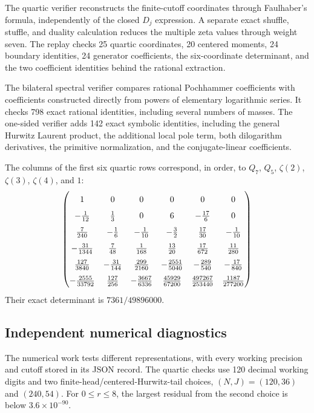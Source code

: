 The quartic verifier reconstructs the finite-cutoff coordinates through
Faulhaber's formula, independently of the closed $D_j$ expression.
A separate exact shuffle, stuffle, and duality calculation reduces
the multiple zeta values through weight seven.  The replay checks
25 quartic coordinates, 20 centered moments, 24 boundary identities,
24 generator coefficients, the six-coordinate determinant, and the
two coefficient identities behind the rational extraction.

The bilateral spectral verifier compares rational Pochhammer
coefficients with coefficients constructed directly from powers of
elementary logarithmic series.  It checks 798 exact rational
identities, including several numbers of masses.  The one-sided
verifier adds 142 exact symbolic identities, including the general
Hurwitz Laurent product, the additional local pole term, both
dilogarithm derivatives, the primitive normalization, and the
conjugate-linear coefficients.

The columns of the first six quartic rows correspond, in order, to
$Q_7$, $Q_5$, $\zeta(2)$, $\zeta(3)$, $\zeta(4)$, and $1$:
\[
\begingroup\renewcommand{\arraystretch}{1.6}
\begin{pmatrix}
1&0&0&0&0&0\\
-\frac1{12}&\frac13&0&6&-\frac{17}{6}&0\\
\frac7{240}&-\frac16&-\frac1{10}&-\frac32&\frac{17}{30}&-\frac1{10}\\
-\frac{31}{1344}&\frac7{48}&\frac1{168}&\frac{13}{20}&\frac{17}{672}&\frac{11}{280}\\
\frac{127}{3840}&-\frac{31}{144}&\frac{299}{2160}&-\frac{2551}{5040}&-\frac{289}{540}&-\frac{17}{840}\\
-\frac{2555}{33792}&\frac{127}{256}&-\frac{3667}{6336}&\frac{45929}{67200}&\frac{497267}{253440}&\frac{1187}{277200}
\end{pmatrix}
\endgroup
\]
Their exact determinant is $7361/49896000$.

\subsection{Independent numerical diagnostics}

The numerical work tests different representations, with every working
precision and cutoff stored in its JSON record.  The quartic checks
use 120 decimal working digits and two finite-head/centered-Hurwitz-tail
choices, $(N,J)=(120,36)$ and $(240,54)$.  For $0\le r\le8$, the
largest residual from the second choice is below
$3.6\times10^{-90}$.

